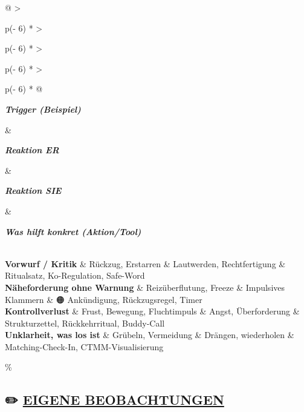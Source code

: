\begin{longtable}[]{@{}
  >{\raggedright\arraybackslash}p{(\columnwidth - 6\tabcolsep) * }
  >{\raggedright\arraybackslash}p{(\columnwidth - 6\tabcolsep) * }
  >{\raggedright\arraybackslash}p{(\columnwidth - 6\tabcolsep) * }
  >{\raggedright\arraybackslash}p{(\columnwidth - 6\tabcolsep) * }@{}}
\toprule\noalign{}
\begin{minipage}[b]{\linewidth}\raggedright
\emph{\textbf{Trigger (Beispiel)}}
\end{minipage} \& \begin{minipage}[b]{\linewidth}\raggedright
\emph{\textbf{Reaktion ER}}
\end{minipage} \& \begin{minipage}[b]{\linewidth}\raggedright
\emph{\textbf{Reaktion SIE}}
\end{minipage} \& \begin{minipage}[b]{\linewidth}\raggedright
\emph{\textbf{Was hilft konkret (Aktion/Tool)}}
\end{minipage} \\
\midrule\noalign{}
\endhead
\bottomrule\noalign{}
\endlastfoot
\textbf{Vorwurf / Kritik} \& Rückzug, Erstarren \& Lautwerden, Rechtfertigung \& 🔁 Ritualsatz, Ko-Regulation, Safe-Word \\
\textbf{Näheforderung ohne Warnung} \& Reizüberflutung, Freeze \& Impulsives Klammern \& 🟠 Ankündigung, Rückzugsregel, Timer \\
\textbf{Kontrollverlust} \& Frust, Bewegung, Fluchtimpuls \& Angst, Überforderung \& 🔴 Strukturzettel, Rückkehrritual, Buddy-Call \\
\textbf{Unklarheit, was los ist} \& Grübeln, Vermeidung \& Drängen, wiederholen \& 🧠 Matching-Check-In, CTMM-Visualisierung \\
\end{longtable}

\hypertarget{eigene-beobachtungen}{\%
\subsection{\texorpdfstring{✏️ \textbf{\ul{EIGENE BEOBACHTUNGEN}} }{✏️ EIGENE BEOBACHTUNGEN }}\label{eigene-beobachtungen}}

